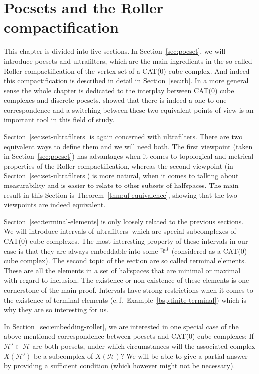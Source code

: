 \section{Pocsets and the Roller compactification}
\label{sec:roller}

This chapter is divided into five sections. In Section~\ref{sec:pocset}, we will introduce pocsets and ultrafilters, which are the main ingredients in the so called Roller compactification of the vertex set of a CAT(0) cube complex. And indeed this compactification is described in detail in Section~\ref{sec:rb}. In a more general sense the whole chapter is dedicated to the interplay between CAT(0) cube complexes and discrete pocsets. \textcite{Roller1999} showed that there is indeed a one-to-one-correspondence and a switching between these two equivalent points of view is an important tool in this field of study.

Section~\ref{sec:set-ultrafilters} is again concerned with ultrafilters. There are two equivalent ways to define them and we will need both. The first viewpoint (taken in Section~\ref{sec:pocset}) has advantages when it comes to topological and metrical properties of the Roller compactification, whereas the second viewpoint (in Section~\ref{sec:set-ultrafilters}) is more natural, when it comes to talking about measurability and is easier to relate to other subsets of halfspaces. The main result in this Section is Theorem~\ref{thm:uf-equivalence}, showing that the two viewpoints are indeed equivalent.

Section~\ref{sec:terminal-elements} is only loosely related to the previous sections. We will introduce intervals of ultrafilters, which are special subcomplexes of CAT(0) cube complexes. The most interesting property of these intervals in our case is that they are always embeddable into some \(\mathbb{R}^d\) (considered as a CAT(0) cube complex). The second topic of the section are so called terminal elements. These are all the elements in a set of halfspaces that are minimal or maximal with regard to inclusion. The existence or non-existence of these elements is one cornerstone of the main proof. Intervals have strong restrictions when it comes to the existence of terminal elements (c.\,f.\ Example~\ref{bsp:finite-terminal}) which is why they are so interesting for us.

In Section~\ref{sec:embedding-roller}, we are interested in one special case of the above mentioned correspondence between pocsets and CAT(0) cube complexes: If \(\mathcal{H'} \subset \mathcal{H}\) are both pocsets, under which circumstances will the associated complex \(X(\mathcal{H}')\) be a subcomplex of \(X(\mathcal{H})\)? We will be able to give a partial answer by providing a sufficient condition (which however might not be necessary).

